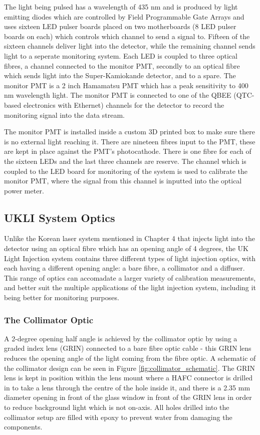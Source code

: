 The light being pulsed has a wavelength of 435 nm and is produced by light emitting diodes which are controlled by Field Programmable Gate Arrays and uses sixteen LED pulser boards placed on two motherboards (8 LED pulser boards on each) which controls which channel to send a signal to. Fifteen of the sixteen channels deliver light into the detector, while the remaining channel sends light to a seperate monitoring system. Each LED is coupled to three optical fibres, a channel connected to the monitor PMT, secondly to an optical fibre which sends light into the Super-Kamiokande detector, and to a spare. The monitor PMT is a 2 inch Hamamatsu PMT which has a peak sensitivity to 400 nm wavelength light. The monitor PMT is connected to one of the QBEE (QTC-based electronics with Ethernet) channels for the detector to record the monitoring signal into the data stream. 
\newline

The monitor PMT is installed inside a custom 3D printed box to make sure there is no external light reaching it. There are nineteen fibres input to the PMT, these are kept in place against the PMT's photocathode. There is one fibre for each of the sixteen LEDs and the last three channels are reserve. The channel which is coupled to the LED board for monitoring of the system is used to calibrate the monitor PMT, where the signal from this channel is inputted into the optical power meter.

\subsection{UKLI System Optics}

Unlike the Korean laser system mentioned in Chapter 4 that injects light into the detector using an optical fibre which has an opening angle of 4 degrees, the UK Light Injection system contains three different types of light injection optics, with each having a different opening angle: a bare fibre, a collimator and a diffuser. This range of optics can accomadate a larger variety of calibration measurements, and better suit the multiple applications of the light injection system, including it being better for monitoring purposes. 

\subsubsection{The Collimator Optic}

A 2-degree opening half angle is achieved by the collimator optic by using a graded index lens (GRIN) connected to a bare fibre optic cable - this GRIN lens reduces the opening angle of the light coming from the fibre optic. A schematic of the collimator design can be seen in Figure \ref{fig:collimator_schematic}. The GRIN lens is kept in position within the lens mount where a HAFC connector is drilled in to take a lens through the centre of the hole inside it, and there is a 2.35 mm diameter opening in front of the glass window in front of the GRIN lens in order to reduce background light which is not on-axis. All holes drilled into the collimator setup are filled with epoxy to prevent water from damaging the components. 

